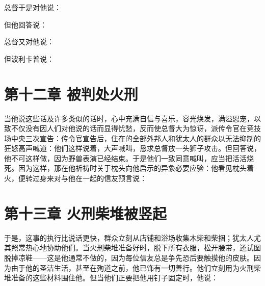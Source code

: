 总督于是对他说：\par

但他回答说：\par

总督又对他说：\par

但波利卡普说：\par


\section{第十二章 被判处火刑}

当他说这些话及许多类似的话时，心中充满自信与喜乐，容光焕发，满溢恩宠，以致不仅没有因人们对他说的话而显得忧愁，反而使总督大为惊讶，派传令官在竞技场中央三次宣告：传令官宣告后，住在的全部外邦人和犹太人的群众以无法抑制的狂怒高声喊道：他们这样说着，大声喊叫，恳求总督放一头狮子攻击。但回答说，他不可这样做，因为野兽表演已经结束。于是他们一致同意喊叫，应当把活活烧死。因为这样，那在他祈祷时关于枕头向他启示的异象必要应验：他看见枕头着火，便转过身来对与他在一起的信友预言说：\par


\section{第十三章 火刑柴堆被竖起}

于是，这事的执行比说话更快，群众立刻从店铺和浴场收集木柴和柴捆；犹太人尤其照常热心地协助他们。当火刑柴堆准备好时，脱下所有衣服，松开腰带，还试图脱掉凉鞋——这是他通常不做的，因为每位信友总是争先恐后要触摸他的皮肤。因为由于他的圣洁生活，甚至在殉道之前，他已饰有一切善行。他们立刻用为火刑柴堆准备的这些材料围住他。但当他们正要把他用钉子固定时，他说：\par

